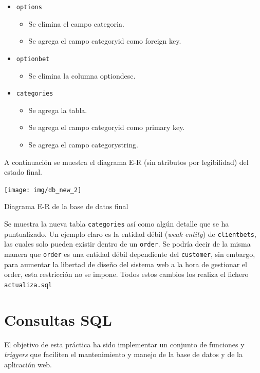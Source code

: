 \documentclass{article}
\begin{document}
\begin{itemize}
\begin{itemize}
        \end{itemize}
    \item\texttt{options}
        \begin{itemize}
            \item Se elimina el campo categoria.
            \item Se agrega el campo categoryid como foreign key.
        \end{itemize}
    \item\texttt{optionbet}
        \begin{itemize}
            \item Se elimina la columna optiondesc.
        \end{itemize}
    \item\texttt{categories}
        \begin{itemize}
            \item Se agrega la tabla.
            \item Se agrega el campo categoryid como primary key.
            \item Se agrega el campo categorystring.
        \end{itemize}
\end{itemize}
\newpage
A continuación se muestra el diagrama E-R (sin atributos por legibilidad) del estado final.
\smallbreak
\begin{minipage}{\linewidth}
    \centering
    \captionsetup{type=figure}
    \texttt{[image: img/db\_new\_2]}
    \caption{Diagrama E-R de la base de datos final}
    \label{fig:fig2}
\end{minipage}
\medbreak
Se muestra la nueva tabla \texttt{categories} así como algún detalle que se ha puntualizado. Un ejemplo claro es la entidad débil (\textit{weak entity}) de \texttt{clientbets}, las cuales solo pueden existir dentro de un \texttt{order}. Se podría decir de la misma manera que \texttt{order} es una entidad débil dependiente del \texttt{customer}, sin embargo, para aumentar la libertad de diseño del sistema web a la hora de gestionar el order, esta restricción no se impone.
Todos estos cambios los realiza el fichero \texttt{actualiza.sql}

\section{Consultas SQL}
El objetivo de esta práctica ha sido implementar un conjunto de funciones y \textit{triggers} que faciliten el mantenimiento y manejo de la base de datos y de la aplicación web.
\end{document}
